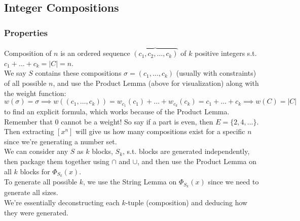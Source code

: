 \documentclass[11pt]{article}
\newcommand{\nl}{\\[5pt]}
\begin{document}
\subsection{Integer Compositions}
\subsubsection{Properties}
Composition of $n$ is an ordered sequence $\overbrace{(c_1, c_2, \dots, c_k)}$ of $k$ positive integers s.t. $c_1 + \dots + c_k = |C| = n$. \nl
We say $S$ contains these compositions $\sigma = (c_1, \dots, c_k)$ (usually with constraints) of all possible $n$, and use the Product Lemma (above for visualization) along with the weight function: $$w(\sigma) = \sigma \implies w((c_1, \dots, c_k)) = w_{c_1}(c_1) + \dots + w_{c_k}(c_k) = c_1 + \dots + c_k \implies w(C) = |C|$$
to find an explicit formula, which works because of the Product Lemma. Remember that 0 cannot be a weight! So say if a part is even, then $E = \{2, 4, \dots\}$. Then extracting $[x^n]$ will give us how many compositions exist for a specific $n$ since we're generating a number set. \nl 
We can consider any $S$ as $k$ blocks, $S_k$, s.t. blocks are generated independently, then package them together using $\cap$ and $\cup$, and then use the Product Lemma on all $k$ blocks for $\Phi_{S_k}(x)$.\nl 
To generate all possible $k$, we use the String Lemma on $\Phi_{S_k}(x)$ since we need to generate all sizes.\nl
We're essentially deconstructing each $k$-tuple (composition) and deducing how they were generated. 
\end{document}
